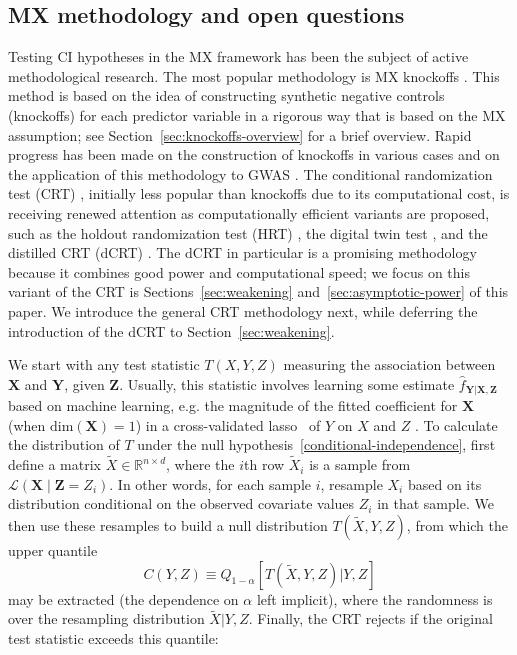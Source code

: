 \documentclass[ejs]{imsart}
\numberwithin{equation}{section}
\theoremstyle{plain}
\theoremstyle{definition}
\theoremstyle{remark}
\newcommand{\prx}{\bm X}
\newcommand{\srx}{X}
\newcommand{\prz}{\bm Z}
\newcommand{\srz}{Z}
\newcommand{\srxk}{\widetilde X}
\newcommand{\pry}{{\bm Y}}
\newcommand{\sry}{Y}
\begin{document}
\subsection{MX methodology and open questions}

Testing CI hypotheses in the MX framework has been the subject of active methodological research. The most popular methodology is MX knockoffs \citep{CetL16}. This method is based on the idea of constructing synthetic negative controls (knockoffs) for each predictor variable in a rigorous way that is based on the MX assumption; see Section~\ref{sec:knockoffs-overview} for a brief overview. Rapid progress has been made on the construction of knockoffs in various cases \citep{SetC17,Romano2019a,Bates2019,Huang2019} and on the application of this methodology to GWAS \citep{SetC17, SetS19}. The conditional randomization test (CRT) \citep{CetL16}, initially less popular than knockoffs due to its computational cost, is receiving renewed attention as computationally efficient variants are proposed, such as the holdout randomization test (HRT) \citep{Tansey2018}, the digital twin test \citep{Bates2020}, and the distilled CRT (dCRT) \citep{Liu2020}. The dCRT in particular is a promising methodology because it combines good power and computational speed; we focus on this variant of the CRT is Sections~\ref{sec:weakening} and~\ref{sec:asymptotic-power} of this paper. We introduce the general CRT methodology next, while deferring the introduction of the dCRT to Section~\ref{sec:weakening}. 

We start with any test statistic $T(\srx, \sry, \srz)$ measuring the association between $\prx$ and $\pry$, given $\prz$. Usually, this statistic involves learning some estimate $\widehat f_{\pry|\prx,\prz}$ based on machine learning, e.g. the magnitude of the fitted coefficient for $\prx$ (when $\text{dim}(\prx) = 1$) in a cross-validated lasso~\citep{T96} of $\sry$ on $\srx$ and $\srz$ \citep{CetL16}. To calculate the distribution of $T$ under the null hypothesis~\eqref{conditional-independence}, first define a matrix  $\srxk \in \mathbb R^{n \times d}$, where the $i$th row $\srxk_i$ is a sample from $\mathcal L(\prx \mid \prz = \srz_i)$. In other words, for each sample $i$, resample $\srx_i$ based on its distribution conditional on the observed covariate values $Z_i$ in that sample. We then use these resamples to build a null distribution $T(\srxk, \sry, \srz)$, from which the upper quantile
\begin{equation}
C(\sry,\srz) \equiv Q_{1-\alpha}[T(\srxk, \sry, \srz)|\sry,\srz]
	\label{upper-quantile}
\end{equation}
may be extracted (the dependence on $\alpha$ left implicit), where the randomness is over the resampling distribution $\srxk |  \sry, \srz$. Finally, the CRT rejects if the original test statistic exceeds this quantile:
\end{document}
